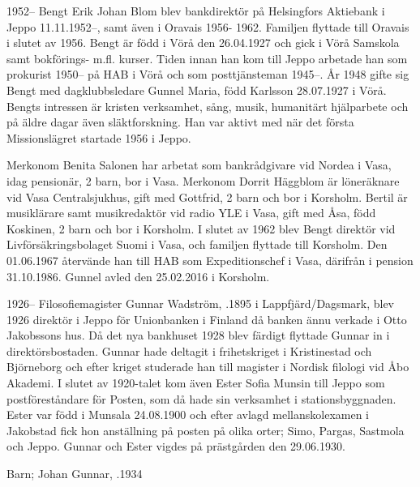 1952--
Bengt Erik Johan Blom blev bankdirektör på Helsingfors Aktiebank i Jeppo 11.11.1952--, samt även i Oravais 1956-		1962. Familjen flyttade till Oravais i slutet av 1956. Bengt är född i Vörå den 26.04.1927 och gick i Vörå Samskola samt bokförings- m.fl. kurser. Tiden innan han kom till Jeppo arbetade han som prokurist 1950-- på HAB i Vörå och som posttjänsteman 1945--. År 1948 gifte sig Bengt med dagklubbsledare Gunnel Maria, född Karlsson 28.07.1927 i Vörå. Bengts intressen är kristen verksamhet, sång, musik, humanitärt hjälparbete och på äldre dagar även släktforskning. Han var aktivt med när det första Missionslägret startade 1956 i Jeppo.
\begin{jhchildren}
  \item {}
  \item {}
  \item {}
\end{jhchildren}
Merkonom Benita Salonen har arbetat som bankrådgivare vid Nordea i Vasa, idag pensionär, 2 barn, bor i Vasa. Merkonom Dorrit Häggblom är löneräknare vid Vasa Centralsjukhus, gift med Gottfrid, 2 barn och bor i Korsholm. Bertil är musiklärare samt musikredaktör vid radio YLE i Vasa, gift med Åsa, född Koskinen, 2 barn och bor i Korsholm. I slutet av 1962 blev Bengt direktör vid Livförsäkringsbolaget Suomi i Vasa, och familjen flyttade till Korsholm. Den 01.06.1967 återvände han till HAB som Expeditionschef i Vasa, därifrån i pension  31.10.1986. Gunnel avled den 25.02.2016 i Korsholm.


1926--
Filosofiemagister Gunnar Wadström, .1895 i Lappfjärd/Dagsmark, blev 1926 direktör i Jeppo för 		Unionbanken i Finland då banken ännu verkade i Otto Jakobssons hus. Då det nya bankhuset 1928 blev färdigt flyttade Gunnar in i direktörsbostaden. Gunnar hade deltagit i frihetskriget i Kristinestad och Björneborg och efter kriget 		studerade han till magister i Nordisk filologi vid Åbo Akademi. I slutet av 1920-talet kom även Ester Sofia Munsin till Jeppo som postföreståndare för Posten, som då hade sin verksamhet i stationsbyggnaden. Ester var född i Munsala 24.08.1900 och efter avlagd mellanskolexamen i Jakobstad fick hon anställning på posten på olika orter; Simo, Pargas, Sastmola och Jeppo. Gunnar och Ester vigdes på prästgården den 29.06.1930.

Barn;	Johan Gunnar, .1934

